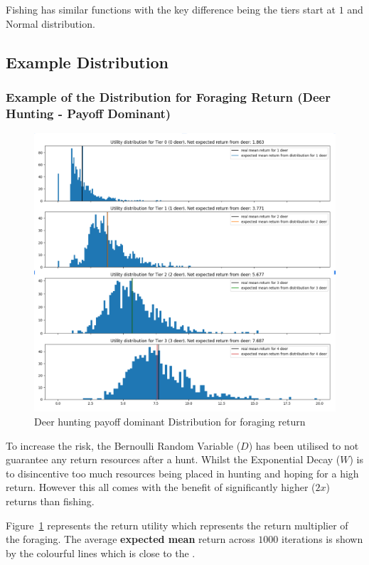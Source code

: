 Fishing has similar functions with the key difference being the tiers start at $1$ and Normal distribution.

\newpage
\subsection{Example Distribution}
\subsubsection{Example of the Distribution for Foraging Return (Deer Hunting - Payoff Dominant)}

\begin{figure}[!htb]
    \centering
    \includegraphics[width=1\textwidth]{04_environment/Images/Distribution of Foraging returns Deer Hunting.PNG}
    \caption{Deer hunting payoff dominant Distribution for foraging return}
    \label{fig:Distribution of Foraging returns Deer Hunting}
\end{figure}

To increase the risk, the Bernoulli Random Variable ($D$) has been utilised to not guarantee any return resources after a hunt. Whilst the Exponential Decay ($W$) is to disincentive too much resources being placed in hunting and hoping for a high return. However this all comes with the benefit of significantly higher ($2x$) returns than fishing.

Figure~\ref{fig:Distribution of Foraging returns Deer Hunting} represents the return utility which represents the return multiplier of the foraging. The average \textbf{expected mean} return across $1000$ iterations is shown by the colourful lines which is close to the .


